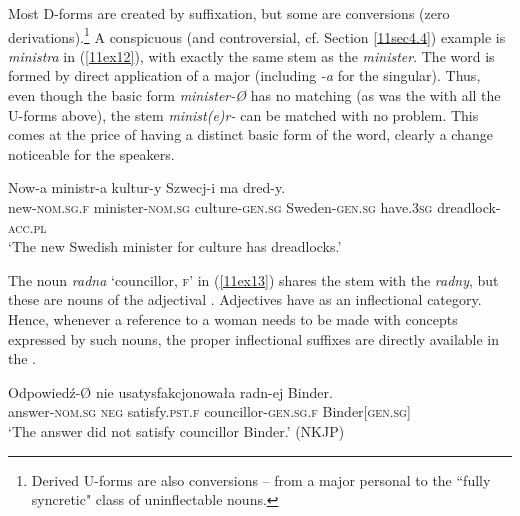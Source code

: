 \documentclass[output=paper,colorlinks,citecolor=brown]{langscibook}
\begin{document}
Most D-forms are created by suffixation, but some are conversions (zero derivations).\footnote{Derived U-forms are also conversions -- from a major  personal  to the ``fully syncretic" class of uninflectable nouns.} A conspicuous (and controversial, cf. Section \ref{11sec4.4}) example is \emph{ministra} in (\ref{11ex12}), with exactly the same stem as the  \emph{minister}. The word is formed by direct application of a major   (including \emph{-a} for the  singular). Thus, even though the basic form \emph{minister-Ø} has no matching   (as was the  with all the U-forms above), the stem \emph{minist(e)r-} can be matched with no problem. This comes at the price of having a distinct basic form of the word, clearly a change noticeable for the speakers.

\begin{exe}
	\ex \label{11ex12}
	\gll Now-a ministr-a kultur-y Szwecj-i ma dred-y. \\
	new-\textsc{nom.sg.f} minister-\textsc{nom.sg} culture-\textsc{gen.sg} Sweden-\textsc{gen.sg} have.\textsc{3sg} dreadlock-\textsc{acc.pl} \\
	\trans ‘The new Swedish minister for culture has dreadlocks.’\footnotemark
\end{exe}

The noun \emph{radna} `councillor, \textsc{f}' in (\ref{11ex13}) shares the stem with the  \emph{radny}, but these are nouns of the adjectival . Adjectives have  as an inflectional category. Hence, whenever a reference to a woman needs to be made with concepts expressed by such nouns, the proper inflectional suffixes are directly available in the .

\begin{exe}
	\ex \label{11ex13}
	\gll Odpowiedź-Ø nie usatysfakcjonowała radn-ej Binder. \\
	answer-\textsc{nom.sg} \textsc{neg} satisfy.\textsc{pst.f} councillor-\textsc{gen.sg.f} Binder[\textsc{gen.sg}] \\
	\trans ‘The answer did not satisfy councillor Binder.’ \hfill (NKJP)
\end{exe}
\end{document}
